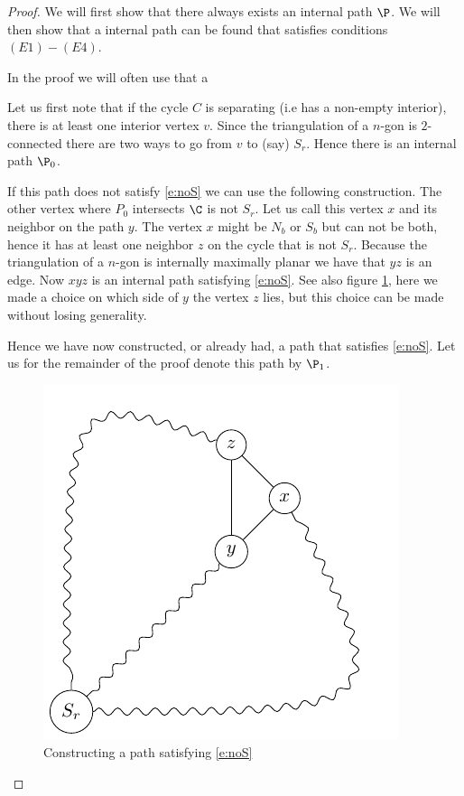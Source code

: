 \begin{proof}
We will first show that there always exists an internal path $\P$. We will then show that a internal path can be found that satisfies conditions $(E1) - (E4)$.

In the proof we will often use that a

Let us first note that if the cycle $C$ is separating (i.e has a non-empty interior), there is at least one interior vertex $v$. Since the triangulation of a $n$-gon is $2$-connected there are two ways to go from $v$ to (say) $S_r$. Hence there is an internal path $\P_0$.

If this path does not satisfy \ref{e:noS} we can use the following construction. The other vertex where $P_0$ intersects $\C$ is not $S_r$. Let us call this vertex $x$ and its neighbor on the path $y$. The vertex $x$ might be $N_b$ or $S_b$ but can not be both, hence it has at least one neighbor $z$ on the cycle that is not $S_r$. Because the triangulation of a $n$-gon is internally maximally planar we have that $yz$ is an edge. Now $xyz$ is an internal path satisfying \ref{e:noS}. See also figure \ref{fig:E1}, here we made a choice on which side of $y$ the vertex $z$ lies, but this choice can be made without losing generality.

Hence we have now constructed, or already had, a path that satisfies \ref{e:noS}. Let us for the remainder of the proof denote this path by $\P_1$.


\begin{figure}[ht]
\centering
\includegraphics[]{algo/img/E1}
\caption{Constructing a path satisfying \ref{e:noS} \label{fig:E1}}
\end{figure}


\end{proof}
